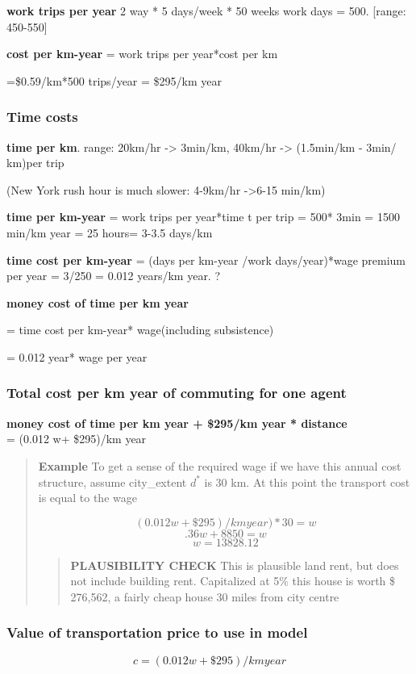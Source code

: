  \textbf{work trips per year} 2 way * 5 days/week * 50 weeks work days = 500. [range: 450-550]

\textbf{cost per km-year} = work trips per year*cost per km

=\$0.59/km*500 trips/year  =  \$295/km year 

\subsubsection{Time costs}
\textbf{time per km}. range: 20km/hr -> 3min/km, 40km/hr -> (1.5min/km - 3min/ km)per trip 

(New York rush hour is much slower:  4-9km/hr ->6-15 min/km)

\textbf{time  per km-year} = work trips per year*time t per trip = 500* 3min  = 1500 min/km year = 25 hours= 3-3.5 days/km
 
\textbf{time cost per km-year} =  (days per km-year /work days/year)*wage premium per year  = 3/250 = 0.012 years/km year. ?

\textbf{money cost of time per km year} 

= time cost per km-year* wage(including subsistence) 

= 0.012 year* wage per year

\subsubsection{Total cost per km year of commuting for one agent}
\textbf{money cost of time per km year + \$295/km year * distance} \\
= (0.012 w+ \$295)/km year 
    \begin{quotation}
    \textbf{Example}
    To get a sense of the required wage if we have this annual cost structure, assume city\_extent $d^*$ is 30 km. At this point the transport cost is equal to the wage

\[(0.012 w+ \$295)/km year)*30 =  w\] 
\[.36w+ 8850=w\]
\[w=13828.12\]
\begin{quotation}
\textbf{PLAUSIBILITY CHECK}
This is plausible land rent, but does not include building rent. 
Capitalized at 5\% this house is worth \$ 276,562, a fairly cheap house 30 miles from city centre
\end{quotation}
\end{quotation}



\subsubsection{Value of transportation price to use in model}
\[ {c}=(0.012 w+ \$295)/km year \]






